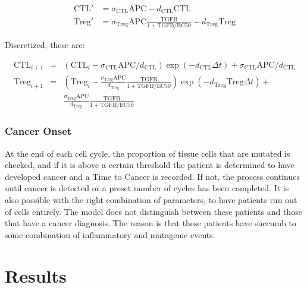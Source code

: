 \documentclass{article}
\begin{document}
\begin{align*}
\text{CTL}' & = \sigma_{\text{CTL}}\text{APC} - d_{\text{CTL}}\text{CTL} \\
\text{Treg}' & = \sigma_{\text{Treg}}\text{APC} \frac{\text{TGFB}}{1+\text{TGFB}/\text{EC50}}- d_{\text{Treg}}\text{Treg}
\end{align*}

Discretized, these are:

\begin{align*}
\text{CTL}_{i+1} & = & \left (\text{CTL}_i-\sigma_{\text{CTL}}\text{APC}/d_{\text{CTL}}\right )\exp(- d_{\text{CTL}}\Delta t) + \sigma_{\text{CTL}}\text{APC}/d_{\text{CTL}}\\
\text{Treg}_{i+1} & = & \left (\text{Treg}_i-\frac{\sigma_{\text{Treg}}\text{APC}}{d_{\text{Treg}}} \frac{\text{TGFB}}{1+\text{TGFB}/\text{EC50}}\right )\exp(-d_{\text{Treg}}\text{Treg}\Delta t)+\\
& & \frac{\sigma_{\text{Treg}}\text{APC}}{d_{\text{Treg}}} \frac{\text{TGFB}}{1+\text{TGFB}/\text{EC50}}
\end{align*}

\subsubsection{Cancer Onset}
At the end of each cell cycle, the proportion of tissue cells that are mutated is checked, and if it is above a certain threshold the patient is determined to have developed cancer and a Time to Cancer is recorded.
If not, the process continues until cancer is detected or a preset number of cycles has been completed.
It is also possible with the right combination of parameters, to have patients run out of cells entirely.
The model does not distinguish between these patients and those that have a cancer diagnosis.
The reason is that these patients have succumb to some combination of inflammatory and mutagenic events.


\section{Results}
\end{document}
